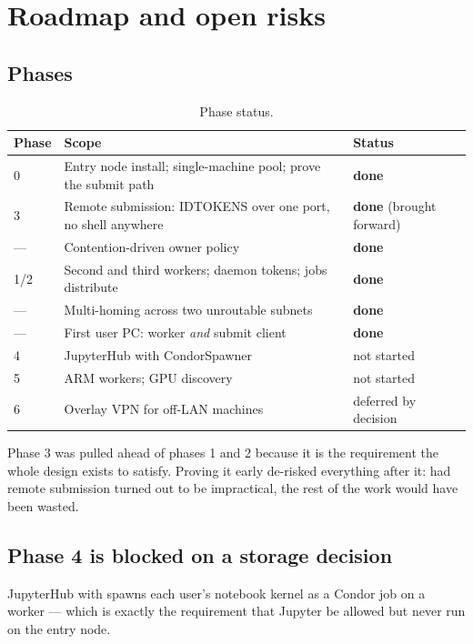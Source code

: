 \chapter{Roadmap and open risks}
\label{ch:roadmap}

\section{Phases}

\begin{table}[H]
\centering
\begin{tabularx}{\textwidth}{l L{0.46\textwidth} Y}
\toprule
\textbf{Phase} & \textbf{Scope} & \textbf{Status} \\
 & Entry node install; single-machine pool; prove the submit path & \textbf{done} \\
3 & Remote submission: IDTOKENS over one port, no shell anywhere & \textbf{done} (brought forward) \\
--- & Contention-driven owner policy & \textbf{done} \\
1/2 & Second and third workers; daemon tokens; jobs distribute & \textbf{done} \\
--- & Multi-homing across two unroutable subnets & \textbf{done} \\
--- & First user PC: worker \emph{and} submit client & \textbf{done} \\
4 & JupyterHub with  CondorSpawner & not started \\
5 & ARM workers; GPU discovery & not started \\
6 & Overlay VPN for off-LAN machines & deferred by decision \\
\bottomrule
\end{tabularx}
\caption{Phase status.}
\end{table}

Phase 3 was pulled ahead of phases 1 and 2 because it is the requirement the
whole design exists to satisfy. Proving it early de-risked everything after it:
had remote submission turned out to be impractical, the rest of the work would
have been wasted.

\section{Phase 4 is blocked on a storage decision}

JupyterHub with  spawns each user's notebook kernel as a Condor
job on a worker --- which is exactly the requirement that Jupyter be allowed but
never run on the entry node.

